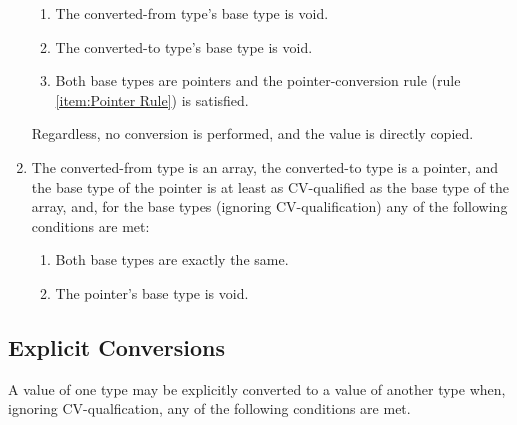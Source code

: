 \documentclass[letterpaper,12pt]{book}
\begin{document}
\begin{enumerate}
\begin{enumerate}
		\item The converted-from type's base type is void.
		
		\item The converted-to type's base type is void.
		
		\item Both base types are pointers and the pointer-conversion rule (rule \ref{item:Pointer Rule}) is satisfied.
	\end{enumerate}
	
	Regardless, no conversion is performed, and the value is directly copied.
	
	\item The converted-from type is an array, the converted-to type is a pointer, and the base type of the pointer is at least as CV-qualified as the base type of the array, and, for the base types (ignoring CV-qualification) any of the following conditions are met:
	\begin{enumerate}
		\item Both base types are exactly the same.
		
		\item The pointer's base type is void.
	\end{enumerate}
\end{enumerate}

\subsection{Explicit Conversions}\label{subsection:Explicit Conversions}

A value of one type may be explicitly converted to a value of another type when, ignoring CV-qualfication, any of the following conditions are met.
\end{document}
